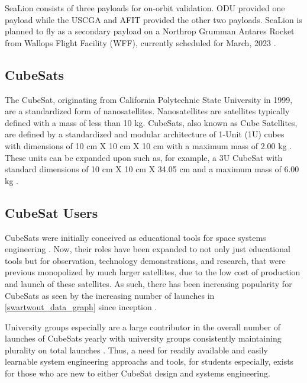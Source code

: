 \documentclass[conf]{new-aiaa}
\begin{document}
SeaLion consists of three payloads for on-orbit validation.  ODU provided one payload while the USCGA and AFIT provided the other two payloads.  SeaLion is planned to fly as a secondary payload on a Northrop Grumman Antares Rocket from Wallops Flight Facility (WFF), currently scheduled for March, 2023 \cite{sealion_cdr}.

\subsection{CubeSats}

The CubeSat, originating from California Polytechnic State University in 1999, are a standardized form of nanosatellites.  Nanosatellites are satellites typically defined with a mass of less than 10 kg.  CubeSats, also known as Cube Satellites, are defined by a standardized and modular architecture of 1-Unit (1U) cubes with dimensions of 10 cm X 10 cm X 10 cm with a maximum mass of 2.00 kg \cite{cds_rev14}.  These units can be expanded upon such as, for example, a 3U CubeSat with standard dimensions of 10 cm X 10 cm X 34.05 cm and a maximum mass of 6.00 kg \cite{cds_rev14}.

\subsection{CubeSat Users}

CubeSats were initially conceived as educational tools for space systems engineering \cite{heidt_new}.  Now, their roles have been expanded to not only just educational tools but for observation, technology demonstrations, and research, that were previous monopolized by much larger satellites, due to the low cost of production and launch of these satellites.  As such, there has been increasing popularity for CubeSats as seen by the increasing number of launches in \ref{swartwout_data_graph} since inception \cite{swartwout_data}.

University groups especially are a large contributor in the overall number of launches of CubeSats yearly with university groups consistently maintaining plurality on total launches \cite{swartwout_data}. Thus, a need for readily available and easily learnable system engineering approachs and tools, for students especially, exists for those who are new to either CubeSat design and systems engineering.
\end{document}
